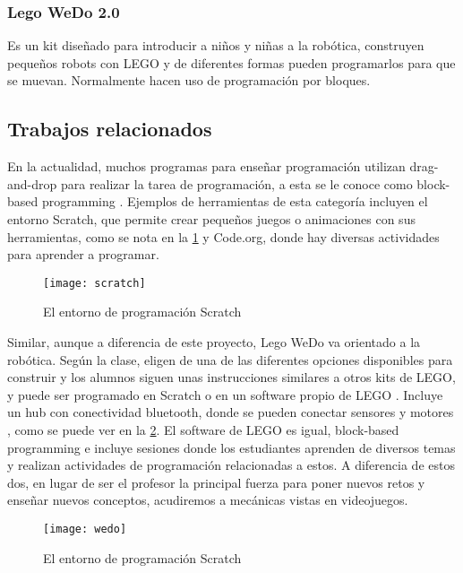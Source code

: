 \subsubsection{Lego WeDo 2.0}
Es un kit diseñado para introducir a niños y niñas a la robótica, 
construyen pequeños robots con LEGO y de diferentes 
formas pueden programarlos para que se muevan. 
Normalmente hacen uso de programación por bloques.

\subsection{Trabajos relacionados}
En la actualidad, muchos programas para enseñar programación utilizan 
drag-and-drop para realizar la tarea de programación, 
a esta se le conoce como block-based programming \cite{block_based_programming}. 
Ejemplos de herramientas de esta categoría incluyen el entorno Scratch, 
que permite crear pequeños juegos o animaciones con sus herramientas, 
como se nota en la \ref{fig:scratch_scrn} y Code.org, donde hay diversas actividades 
para aprender a programar.

\begin{figure}
    \caption{El entorno de programación Scratch}
    \centering
    \texttt{[image: scratch]}
    \label{fig:scratch_scrn}
\end{figure}

Similar, aunque a diferencia de este proyecto, Lego WeDo va orientado a la robótica. Según la clase, eligen de una de las diferentes opciones disponibles para construir y los alumnos siguen unas instrucciones similares a otros kits de LEGO, y puede ser programado en Scratch o en un software propio de LEGO \cite{lego_wedo_explanation}. Incluye un hub con conectividad bluetooth, donde se pueden conectar sensores y motores \cite{lego_wedo_site}, como se puede ver en la \ref{fig:wedo}. El software de LEGO es igual, block-based programming e incluye sesiones donde los estudiantes aprenden de diversos temas y realizan actividades de programación relacionadas a estos. A diferencia de estos dos, en lugar de ser el profesor la principal fuerza para poner nuevos retos y enseñar nuevos conceptos, acudiremos a mecánicas vistas en videojuegos.

\begin{figure}
    \caption{El entorno de programación Scratch}
    \centering
    \texttt{[image: wedo]}
    \label{fig:wedo}
\end{figure}


